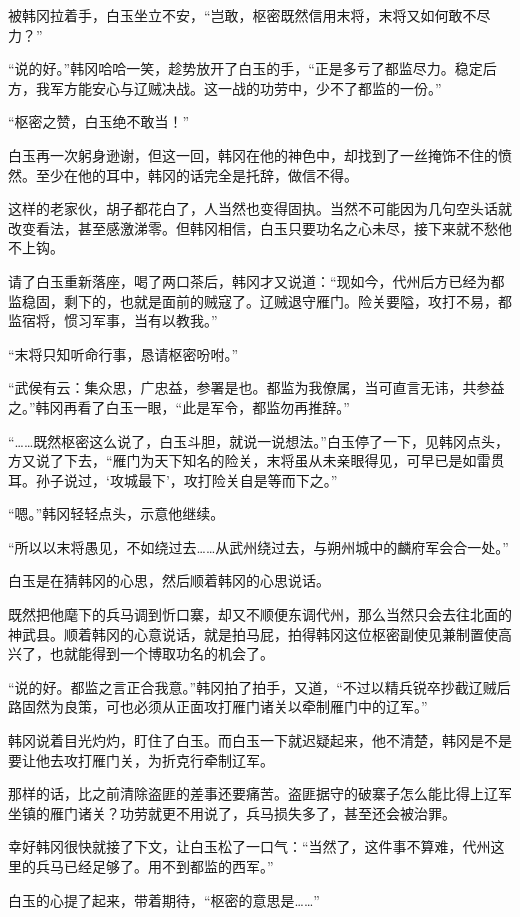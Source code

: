 被韩冈拉着手，白玉坐立不安，“岂敢，枢密既然信用末将，末将又如何敢不尽力？”

“说的好。”韩冈哈哈一笑，趁势放开了白玉的手，“正是多亏了都监尽力。稳定后方，我军方能安心与辽贼决战。这一战的功劳中，少不了都监的一份。”

“枢密之赞，白玉绝不敢当！”

白玉再一次躬身逊谢，但这一回，韩冈在他的神色中，却找到了一丝掩饰不住的愤然。至少在他的耳中，韩冈的话完全是托辞，做信不得。

这样的老家伙，胡子都花白了，人当然也变得固执。当然不可能因为几句空头话就改变看法，甚至感激涕零。但韩冈相信，白玉只要功名之心未尽，接下来就不愁他不上钩。

请了白玉重新落座，喝了两口茶后，韩冈才又说道：“现如今，代州后方已经为都监稳固，剩下的，也就是面前的贼寇了。辽贼退守雁门。险关要隘，攻打不易，都监宿将，惯习军事，当有以教我。”

“末将只知听命行事，恳请枢密吩咐。”

“武侯有云：集众思，广忠益，参署是也。都监为我僚属，当可直言无讳，共参益之。”韩冈再看了白玉一眼，“此是军令，都监勿再推辞。”

“……既然枢密这么说了，白玉斗胆，就说一说想法。”白玉停了一下，见韩冈点头，方又说了下去，“雁门为天下知名的险关，末将虽从未亲眼得见，可早已是如雷贯耳。孙子说过，‘攻城最下’，攻打险关自是等而下之。”

“嗯。”韩冈轻轻点头，示意他继续。

“所以以末将愚见，不如绕过去……从武州绕过去，与朔州城中的麟府军会合一处。”

白玉是在猜韩冈的心思，然后顺着韩冈的心思说话。

既然把他麾下的兵马调到忻口寨，却又不顺便东调代州，那么当然只会去往北面的神武县。顺着韩冈的心意说话，就是拍马屁，拍得韩冈这位枢密副使见兼制置使高兴了，也就能得到一个博取功名的机会了。

“说的好。都监之言正合我意。”韩冈拍了拍手，又道，“不过以精兵锐卒抄截辽贼后路固然为良策，可也必须从正面攻打雁门诸关以牵制雁门中的辽军。”

韩冈说着目光灼灼，盯住了白玉。而白玉一下就迟疑起来，他不清楚，韩冈是不是要让他去攻打雁门关，为折克行牵制辽军。

那样的话，比之前清除盗匪的差事还要痛苦。盗匪据守的破寨子怎么能比得上辽军坐镇的雁门诸关？功劳就更不用说了，兵马损失多了，甚至还会被治罪。

幸好韩冈很快就接了下文，让白玉松了一口气：“当然了，这件事不算难，代州这里的兵马已经足够了。用不到都监的西军。”

白玉的心提了起来，带着期待，“枢密的意思是……”

